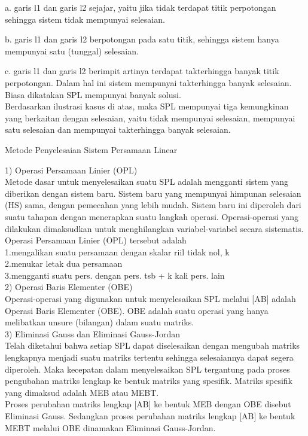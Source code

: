 \begin{eulernotebook}
\begin{eulercomment}
\begin{eulercomment}
\begin{eulercomment}
\begin{eulercomment}
\begin{eulercomment}
a. garis l1 dan garis l2 sejajar, yaitu jika tidak terdapat titik perpotongan sehingga sistem tidak mempunyai selesaian.

b. garis l1 dan garis l2 berpotongan pada satu titik, sehingga sistem
hanya mempunyai satu (tunggal) selesaian.

c. garis l1 dan garis l2 berimpit artinya terdapat takterhingga banyak
titik perpotongan. Dalam hal ini sistem mempunyai takterhingga banyak selesaian. Biasa dikatakan SPL mempunyai banyak solusi.\\

Berdasarkan ilustrasi kasus di atas, maka SPL mempunyai tiga kemungkinan yang berkaitan dengan selesaian, yaitu tidak mempunyai selesaian, mempunyai satu selesaian dan mempunyai takterhingga banyak selesaian.\\

\end{eulercomment}
\begin{eulercomment}
Metode Penyelesaian Sistem Persamaan Linear

1) Operasi Persamaan Linier (OPL)\\
Metode dasar untuk menyelesaikan suatu SPL adalah mengganti sistem
yang diberikan dengan sistem baru. Sistem baru yang mempunyai himpunan selesaian (HS) sama, dengan pemecahan yang lebih mudah. Sistem baru ini diperoleh dari suatu tahapan dengan menerapkan suatu langkah operasi. Operasi-operasi yang dilakukan dimaksudkan untuk menghilangkan variabel-variabel secara sistematis.\\
Operasi Persamaan Linier (OPL) tersebut adalah\\
1.mengalikan suatu persamaan dengan skalar riil tidak nol, k\\
2.menukar letak dua persamaan\\
3.mengganti suatu pers. dengan pers. tsb + k kali pers. lain\\

2) Operasi Baris Elementer (OBE)\\
Operasi-operasi yang digunakan untuk menyelesaikan SPL melalui [A\textbar{}B] adalah Operasi Baris Elementer (OBE). OBE adalah suatu operasi yang hanya melibatkan unsure (bilangan) dalam suatu matriks.\\

3) Eliminasi Gauss dan Eliminasi Gauss-Jordan\\
Telah diketahui bahwa setiap SPL dapat diselesaikan dengan mengubah
matriks lengkapnya menjadi suatu matriks tertentu sehingga selesaiannya dapat segera diperoleh. Maka kecepatan dalam
menyelesaikan SPL tergantung pada proses pengubahan matriks lengkap ke bentuk matriks yang spesifik. Matriks spesifik yang dimaksud adalah MEB atau MEBT.\\
Proses perubahan matriks lengkap [A\textbar{}B] ke bentuk MEB dengan OBE disebut Eliminasi Gauss. Sedangkan proses perubahan matriks lengkap [A\textbar{}B] ke bentuk MEBT melalui OBE dinamakan Eliminasi Gauss-Jordan.\\


\end{eulercomment}
\end{eulercomment}
\end{eulercomment}
\end{eulercomment}
\end{eulercomment}
\end{eulernotebook}
